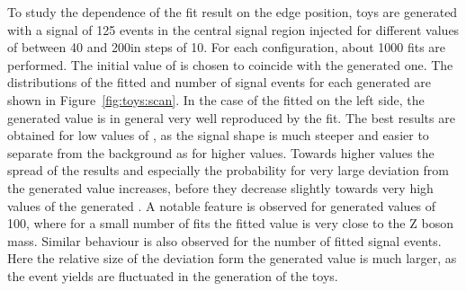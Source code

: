 To study the dependence of the fit result on the edge position, toys are generated with a signal of 125 events in the central signal region injected for different values of \mlledge between 40 and 200\GeV in steps of 10\GeV. For each configuration, about 1000 fits are performed. The initial value of \mlledge is chosen to coincide with the generated one. The distributions of the fitted \mlledge and number of signal events for each generated \mlledge are shown in Figure~\ref{fig:toys:scan}. In the case of the fitted \mlledge on the left side, the generated value is in general very well reproduced by the fit. The best results are obtained for low values of \mlledge, as the signal shape is much steeper and easier to separate from the background as for higher values. Towards higher values the spread of the results and especially the probability for very large deviation from the generated value increases, before they decrease slightly towards very high values of the generated \mlledge. A notable feature is observed for generated values of 100\GeV, where for a small number of fits the fitted value is very close to the Z boson mass. Similar behaviour is also observed for the number of fitted signal events. Here the relative size of the deviation form the generated value is much larger, as the event yields are fluctuated in the generation of the toys. 
